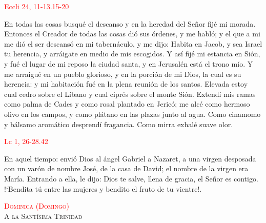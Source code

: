 \documentclass[10pt]{article}
\begin{document}
\begin{multicols}{2}
      \hfill\textcolor{red}{Eccli 24, 11-13.15-20}

      En todas las cosas busqué el descanso y en la heredad del Señor fijé mi morada. Entonces el Creador de todas las cosas dió sus órdenes, y me habló; y el que a mi me dió el ser
      descansó en mi tabernáculo, y me dijo: Habita en Jacob, y sea Israel tu herencia, y arráigate en medio de mis escogidos. Y así fijé mi estancia en Sión, y fué el lugar de mi reposo
      la ciudad santa, y en Jerusalén está el trono mío. Y me arraigué en un pueblo glorioso, y en la porción de mi Dios, la cual es su herencia: y mi habitación fué en la plena reunión
      de los santos. Elevada estoy cual cedro sobre el Líbano y cual ciprés sobre el monte Sión. Extendí mis ramas como palma de Cades y como rosal plantado en Jericó; me alcé como hermoso
      olivo en los campos, y como plátano en las plazas junto al agua. Como cinamomo y bálsamo aromático desprendí fragancia. Como mirra exhalé suave olor.\newline

      \hfill\textcolor{red}{Lc 1, 26-28.42}

      En aquel tiempo: envió Dios al ángel Gabriel a Nazaret, a una virgen desposada con un varón de nombre José, de la casa de David; el nombre de la virgen era María. 
      Entrando a ella, le dijo: Dios te salve, llena de gracia, el Señor es contigo. {!`}Bendita tú entre las mujeres y bendito el fruto de tu vientre!.\newline

      \begin{otherlanguage}{latin}
            

            

            

            

            

            

            
      \end{otherlanguage}

      \begin{center}
            \noindent\textsc{\textcolor{red}{Dominica (Domingo)}\\ {\large A la Santísima Trinidad}}
      \end{center}


\end{multicols}
\end{document}
